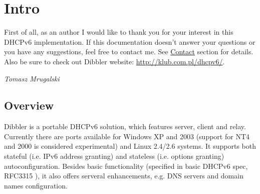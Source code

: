 
\section{Intro}
First of all, as an author I would like to thank you for your interest
in this DHCPv6 implementation. If this documentation doesn't answer
your questions or you have any suggestions, feel free to contact
me. See \hyperlink{contact}{Contact} section for details. Also be sure
to check out Dibbler website: \url{http://klub.com.pl/dhcpv6/}.

\begin{flushright}
\emph{Tomasz Mrugalski}
\end{flushright}


\subsection{Overview}

Dibbler is a portable DHCPv6 solution, which features server, client and
relay. Currently there are ports available for Windows XP and 2003 (support for
NT4 and 2000 is considered experimental) and Linux 2.4/2.6 systems. 
It supports both stateful (i.e. IPv6 address granting) and stateless
(i.e. options granting) autoconfiguration. Besides basic
functionality (specified in basic DHCPv6 spec, RFC3315 \cite{rfc3315}),
it also offers serveral enhancements, e.g. DNS servers and domain names
configuration.

